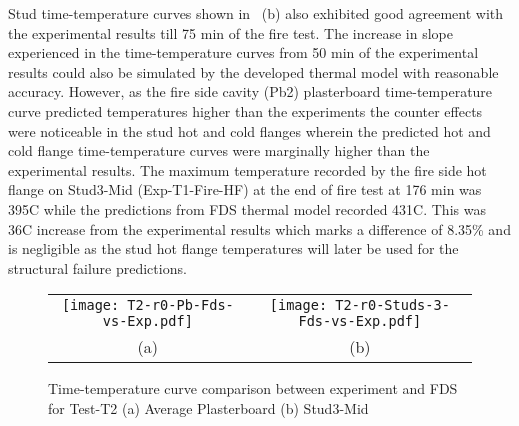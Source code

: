 Stud time-temperature curves shown in ~(b) also exhibited good agreement with the experimental results till 75 min of the fire test. The increase in slope experienced in the time-temperature curves from 50 min of the experimental results could also be simulated by the developed thermal model with reasonable accuracy. However, as the fire side cavity (Pb2) plasterboard time-temperature curve predicted temperatures higher than the experiments the counter effects were noticeable in the stud hot and cold flanges wherein the predicted hot and cold flange time-temperature curves were marginally higher than the experimental results. The maximum temperature recorded by the fire side hot flange on Stud3-Mid (Exp-T1-Fire-HF) at the end of fire test at 176 min was 395\degree C while the predictions from FDS thermal model recorded 431\degree C. This was 36\degree C increase from the experimental results which marks a difference of 8.35\% and is negligible as the stud hot flange temperatures will later be used for the structural failure predictions. 
\begin{figure}[!htbp]
	\centering
		\begin{tabular}{cc}
			\texttt{[image: T2-r0-Pb-Fds-vs-Exp.pdf]} & \texttt{[image: T2-r0-Studs-3-Fds-vs-Exp.pdf]} \\
			(a) & (b) \\
		\end{tabular} 
		\caption{Time-temperature curve comparison between experiment and FDS for Test-T2 (a) Average Plasterboard (b) Stud3-Mid}
		\label{fig:fds-output-pb-studs-t2}
\end{figure}

